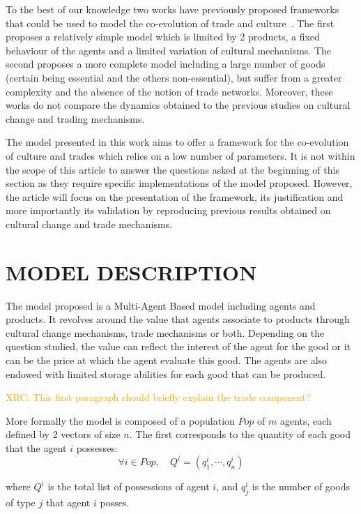 \documentclass{wscpaperproc}
\newcommand{\memo}[2]{\textcolor{#1}{#2}}
\newcommand{\xrc}[1]{\memo{orange}{XRC: #1\\}}
\begin{document}
To the best of our knowledge two works have previously proposed frameworks that could be used to model the co-evolution of trade and culture~\cite{bentley_specialisation_2005,macmillan_agent-based_2008}. The first proposes a relatively simple model which is limited by 2 products, a fixed behaviour of the agents and a limited variation of cultural mechanisms. The second proposes a more complete model including a large number of goods (certain being essential and the others non-essential), but suffer from a greater complexity and the absence of the notion of trade networks. Moreover, these works do not compare the dynamics obtained to the previous studies on cultural change and trading mechanisms.

The model presented in this work aims to offer a framework for the co-evolution of culture and trades which relies on a low number of parameters. It is not within the scope of this article to answer the questions asked at the beginning of this section as they require specific implementations of the model proposed. However, the article will focus on the presentation of the framework, its justification and more importantly its validation by reproducing previous results obtained on cultural change and trade mechanisms.



\section{MODEL DESCRIPTION}

The model proposed is a Multi-Agent Based model including agents and products. It revolves around the value that agents associate to products through cultural change mechanisms, trade mechanisms or both. Depending on the question studied, the value can reflect the interest of the agent for the good or it can be the price at which the agent evaluate this good. The agents are also endowed with limited storage abilities for each good that can be produced. 

\xrc{This first paragraph should briefly explain the trade component?}

More formally the model is composed of a population $Pop$ of $m$ agents, each defined by 2 vectors of size $n$. The first corresponds to the quantity of each good that the agent $i$ possesses: 
$$\forall i \in Pop, \quad Q^i = (q^i_1,\cdots,q^i_n) $$

where $Q^i$ is the total list of possessions of agent $i$, and $q^i_j$ is the number of goods of type $j$ that agent $i$ posses.
\end{document}
